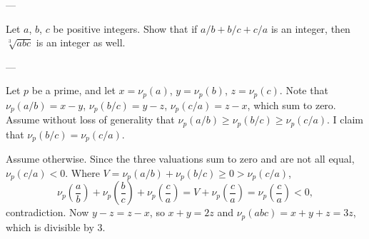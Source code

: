 
---

Let $a$, $b$, $c$ be positive integers. Show that if $a/b+b/c+c/a$ is an integer, then $\sqrt[3]{abc}$ is an integer as well.

---

Let $p$ be a prime, and let $x=\nu_p(a)$, $y=\nu_p(b)$, $z=\nu_p(c)$. Note that $\nu_p(a/b)=x-y$, $\nu_p(b/c)=y-z$, $\nu_p(c/a)=z-x$, which sum to zero. Assume without loss of generality that $\nu_p(a/b)\ge\nu_p(b/c)\ge\nu_p(c/a)$. I claim that $\nu_p(b/c)=\nu_p(c/a)$.

Assume otherwise. Since the three valuations sum to zero and are not all equal, $\nu_p(c/a)<0$. Where $V=\nu_p(a/b)+\nu_p(b/c)\ge0>\nu_p(c/a)$, \[\nu_p\left(\frac ab\right)+\nu_p\left(\frac bc\right)+\nu_p\left(\frac ca\right)=V+\nu_p\left(\frac ca\right)=\nu_p\left(\frac ca\right)<0,\]
contradiction. Now $y-z=z-x$, so $x+y=2z$ and $\nu_p(abc)=x+y+z=3z$, which is divisible by $3$.

